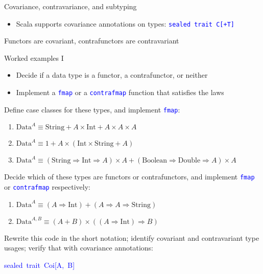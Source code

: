 \documentclass[english]{beamer}
\newenvironment{lyxcode}
   {\par\begin{list}{}{
     \setlength{\rightmargin}{\leftmargin}
     \setlength{\listparindent}{0pt}%
     \raggedright
     \setlength{\itemsep}{0pt}
     \setlength{\parsep}{0pt}
     \normalfont\ttfamily}%
    \def\{{\char`\{}
    \def\}{\char`\}}
    \def\textasciitilde{\char`\~}
    \item[]}
   {\end{list}}
\begin{document}
\begin{frame}{Covariance, contravariance, and subtyping}
\begin{itemize}
a subtype of \texttt{\textcolor{blue}{\footnotesize{}Y}} then we have
\texttt{\textcolor{blue}{\footnotesize{}X $\Rightarrow$ Y}} and we
need \texttt{\textcolor{blue}{\footnotesize{}C{[}X{]} $\Rightarrow$
C{[}Y{]}}}, which is guaranteed if we have a function of typeed if we have a function of type
\[
\left(X\Rightarrow Y\right)\Rightarrow(C^{X}\Rightarrow C^{Y})
\]
\item Scala supports covariance annotations on types: \texttt{\textcolor{blue}{\footnotesize{}sealed
trait C{[}+T{]}}}{\footnotesize \par}
\end{itemize}
Functors are covariant, contrafunctors are contravariant
\end{frame}

\begin{frame}{Worked examples I}

\begin{itemize}
\item Decide if a data type is a functor, a contrafunctor, or neither
\item Implement a \texttt{\textcolor{blue}{\footnotesize{}fmap}} or a \texttt{\textcolor{blue}{\footnotesize{}contrafmap}}
function that satisfies the laws
\end{itemize}
\begin{enumerate}
\item Define case classes for these types, and implement \texttt{\textcolor{blue}{\footnotesize{}fmap}}:
\begin{enumerate}
\item $\text{Data}^{A}\equiv\text{String}+A\times\text{Int}+A\times A\times A$
\item $\text{Data}^{A}\equiv1+A\times(\text{Int}\times\text{String}+A)$
\item $\text{Data}^{A}\equiv\left(\text{String}\Rightarrow\text{Int}\Rightarrow A\right)\times A+\left(\text{Boolean}\Rightarrow\text{Double}\Rightarrow A\right)\times A$
\end{enumerate}
\item Decide which of these types are functors or contrafunctors, and implement
\texttt{\textcolor{blue}{\footnotesize{}fmap}} or \texttt{\textcolor{blue}{\footnotesize{}contrafmap}}
respectively:
\begin{enumerate}
\item $\text{Data}^{A}\equiv\left(A\Rightarrow\text{Int}\right)+\left(A\Rightarrow A\Rightarrow\text{String}\right)$
\item $\text{Data}^{A,B}\equiv\left(A+B\right)\times\left(\left(A\Rightarrow\text{Int}\right)\Rightarrow B\right)$
\end{enumerate}
\item Rewrite this code in the short notation; identify covariant and contravariant
type usages; verify that with covariance annotations:
\begin{lyxcode}
\textcolor{blue}{\footnotesize{}sealed~trait~Coi{[}A,~B{]}}{\footnotesize \par}


\end{lyxcode}
\end{enumerate}
\end{frame}
\end{document}
